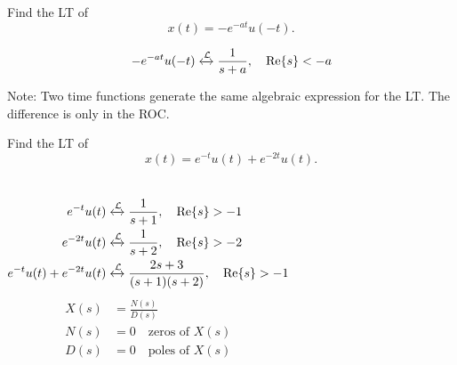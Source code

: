 \begin{frame}[t,allowframebreaks]{}
    \begin{example}
        Find the LT of
        \begin{equation*}
            x(t) = -e^{-at}u(-t).
        \end{equation*}
    \end{example}

    {
        \begin{solution}
            \begin{equation*}
                -e^{-at}u(-t) \xleftrightarrow{\mathcal{L}}   \frac{1}{s+a}, \quad \mathrm{Re}\{s\} < -a
            \end{equation*}
        \end{solution}
        Note: Two time functions generate the same algebraic expression for the LT. The difference is only in the ROC.
    }

\end{frame}

\begin{frame}[t]{}
    \begin{example}
        Find the LT of
        \begin{equation*}
            x(t) = e^{-t}u(t)+ e^{-2t}u(t).
        \end{equation*}
    \end{example}

    {


        \begin{solution}\end{solution}
            \begin{columns}[t]
                    \begin{align*}
                        e^{-t}u(t) &\xleftrightarrow{\mathcal{L}}   \frac{1}{s+1}, \quad \mathrm{Re}\{s\} > -1\\
                        e^{-2t}u(t) &\xleftrightarrow{\mathcal{L}}   \frac{1}{s+2}, \quad \mathrm{Re}\{s\} > -2\\
                        e^{-t}u(t)+ e^{-2t}u(t) &\xleftrightarrow{\mathcal{L}}   \frac{2s+3}{(s+1)(s+2)}, \quad \mathrm{Re}\{s\} > -1
                    \end{align*}
                    \begin{align*}
                        X(s) &= \frac{N(s)}{D(s)}\\
                        N(s) &= 0\quad \text{zeros of } X(s)\\
                        D(s) &= 0\quad \text{poles of } X(s)
                    \end{align*}

                    
            \end{columns}
    }
\end{frame}


